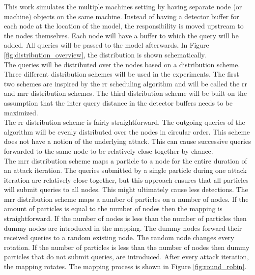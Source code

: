 This work simulates the multiple machines setting by having separate node (or machine) objects on the same machine. Instead of having a detector buffer for each node at the location of the model, the responsibility is moved upstream to the nodes themselves. Each node will have a buffer to which the query will be added. All queries will be passed to the model afterwards. In Figure \ref{fig:distribution_overview}, the distribution is shown schematically.\\

The queries will be distributed over the nodes based on a distribution scheme. Three different distribution schemes will be used in the experiments. The first two schemes are inspired by the \gls{rr} scheduling algorithm \cite{round_robin} and will be called the \gls{rr} and \gls{mrr} distribution schemes. The third distribution scheme will be built on the assumption that the inter query distance in the detector buffers needs to be maximized.\\

The \gls{rr} distribution scheme is fairly straightforward. The outgoing queries of the algorithm will be evenly distributed over the nodes in circular order. This scheme does not have a notion of the underlying attack. This can cause successive queries forwarded to the same node to be relatively close together by chance.\\  

The \gls{mrr} distribution scheme maps a particle to a node for the entire duration of an attack iteration. The queries submitted by a single particle during one attack iteration are relatively close together, but this approach ensures that all particles will submit queries to all nodes. This might ultimately cause less detections. The \gls{mrr} distribution scheme maps a number of particles on a number of nodes. If the amount of particles is equal to the number of nodes then the mapping is straightforward. If the number of nodes is less than the number of particles then dummy nodes are introduced in the mapping. The dummy nodes forward their received queries to a random existing node. The random node changes every rotation. If the number of particles is less than the number of nodes then dummy particles that do not submit queries, are introduced. After every attack iteration, the mapping rotates. The mapping process is shown in Figure \ref{fig:round_robin}.\\ 

